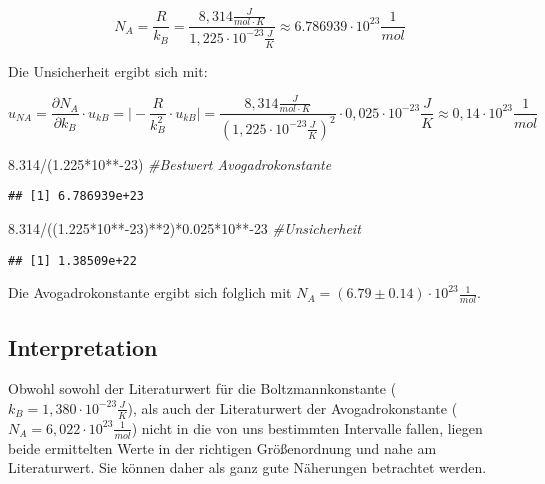 \documentclass[class=article, crop=false]{standalone}
\newenvironment{Shaded}{\begin{snugshade}}{\end{snugshade}}
\newcommand{\CommentTok}[1]{\textcolor[rgb]{0.56,0.35,0.01}{\textit{#1}}}
\newcommand{\DecValTok}[1]{\textcolor[rgb]{0.00,0.00,0.81}{#1}}
\newcommand{\FloatTok}[1]{\textcolor[rgb]{0.00,0.00,0.81}{#1}}
\newcommand{\NormalTok}[1]{#1}
\newcommand{\SpecialCharTok}[1]{\textcolor[rgb]{0.00,0.00,0.00}{#1}}
\begin{document}
\begin{equation*}
N_A = \frac{R}{k_B} = \frac{8,314 \frac{J}{mol\cdot K}}{1,225 \cdot 10^{-23} \frac{J}{K}} \approx 6.786939\cdot 10^{23} \frac{1}{mol}
\end{equation*}

Die Unsicherheit ergibt sich mit:

\begin{equation*}
u_{NA}= \frac {\partial N_A}{\partial k_B} \cdot u_{kB} 
= \vert - \frac{R}{k_B^2} \cdot u_{kB}\vert 
= \frac{8,314 \frac{J}{mol\cdot K}}{(1,225 \cdot 10^{-23} \frac{J}{K})^2} \cdot 0,025 \cdot 10^{-23} \frac{J}{K} \approx 0,14 \cdot 10^{23} \frac{1}{mol}
\end{equation*}

\begin{Shaded}
\begin{Highlighting}[]
\FloatTok{8.314}\SpecialCharTok{/}\NormalTok{(}\FloatTok{1.225}\SpecialCharTok{*}\DecValTok{10}\SpecialCharTok{**{-}}\DecValTok{23}\NormalTok{) }\CommentTok{\#Bestwert Avogadrokonstante}
\end{Highlighting}
\end{Shaded}

\begin{verbatim}
## [1] 6.786939e+23
\end{verbatim}

\begin{Shaded}
\begin{Highlighting}[]
\FloatTok{8.314}\SpecialCharTok{/}\NormalTok{((}\FloatTok{1.225}\SpecialCharTok{*}\DecValTok{10}\SpecialCharTok{**{-}}\DecValTok{23}\NormalTok{)}\SpecialCharTok{**}\DecValTok{2}\NormalTok{)}\SpecialCharTok{*}\FloatTok{0.025}\SpecialCharTok{*}\DecValTok{10}\SpecialCharTok{**{-}}\DecValTok{23} \CommentTok{\#Unsicherheit}
\end{Highlighting}
\end{Shaded}

\begin{verbatim}
## [1] 1.38509e+22
\end{verbatim}

Die Avogadrokonstante ergibt sich folglich mit
\(N_A = (6.79 \pm 0.14) \cdot 10^{23} \frac{1}{mol}\).

\hypertarget{interpretation}{%
\subsection{Interpretation}\label{interpretation}}

Obwohl sowohl der Literaturwert für die Boltzmannkonstante
(\(k_B = 1,380 \cdot 10^{-23} \frac{J}{K}\)), als auch der Literaturwert
der Avogadrokonstante (\(N_A = 6,022 \cdot 10^{23} \frac{1}{mol}\))
nicht in die von uns bestimmten Intervalle fallen, liegen beide
ermittelten Werte in der richtigen Größenordnung und nahe am
Literaturwert. Sie können daher als ganz gute Näherungen betrachtet
werden.
\end{document}
